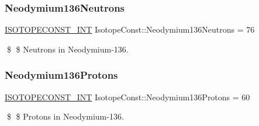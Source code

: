 \subsubsection{\texorpdfstring{Neodymium136\+Neutrons}{Neodymium136Neutrons}}
{\footnotesize\ttfamily \mbox{\hyperlink{group___isotope_const-_macros_ga5f18360b3e99483a35c32d789e62621c}{I\+S\+O\+T\+O\+P\+E\+C\+O\+N\+S\+T\+\_\+\+I\+NT}} Isotope\+Const\+::\+Neodymium136\+Neutrons = 76}

\$ \$ Neutrons in Neodymium-\/136. \mbox{\label{group___isotope_const-_neodymium-_nd136_ga77e343b19520be2f8f86f2286bacfc56}} 
\subsubsection{\texorpdfstring{Neodymium136\+Protons}{Neodymium136Protons}}
{\footnotesize\ttfamily \mbox{\hyperlink{group___isotope_const-_macros_ga5f18360b3e99483a35c32d789e62621c}{I\+S\+O\+T\+O\+P\+E\+C\+O\+N\+S\+T\+\_\+\+I\+NT}} Isotope\+Const\+::\+Neodymium136\+Protons = 60}

\$ \$ Protons in Neodymium-\/136. 
